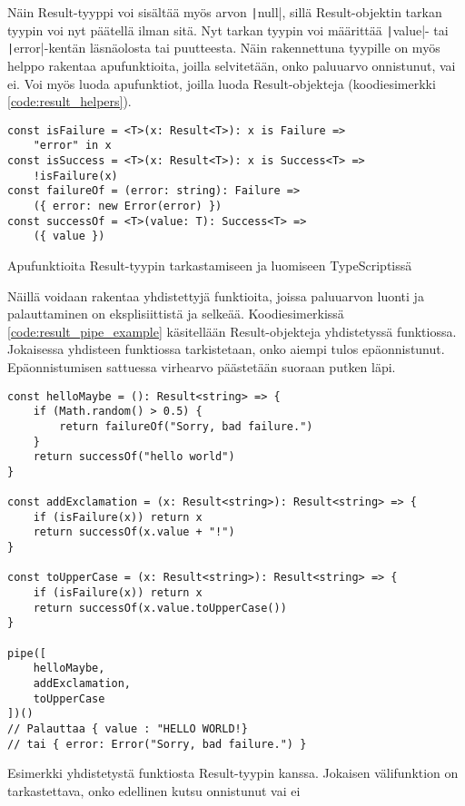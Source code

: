 Näin Result-tyyppi voi sisältää myös arvon \texttt|null|, sillä Result-objektin tarkan tyypin voi nyt päätellä ilman sitä. Nyt tarkan tyypin voi määrittää \texttt|value|- tai \texttt|error|-kentän läsnäolosta tai puutteesta. Näin rakennettuna tyypille on myös helppo rakentaa apufunktioita, joilla selvitetään, onko paluuarvo onnistunut, vai ei. Voi myös luoda apufunktiot, joilla luoda Result-objekteja (koodiesimerkki \ref{code:result_helpers}).

\begin{code}
    \begin{verbatim}
const isFailure = <T>(x: Result<T>): x is Failure => 
    "error" in x
const isSuccess = <T>(x: Result<T>): x is Success<T> => 
    !isFailure(x)
const failureOf = (error: string): Failure => 
    ({ error: new Error(error) })
const successOf = <T>(value: T): Success<T> => 
    ({ value })
    \end{verbatim}
    \caption{Apufunktioita Result-tyypin tarkastamiseen ja luomiseen TypeScriptissä}
    \label{code:result_helpers}
\end{code}

Näillä voidaan rakentaa yhdistettyjä funktioita, joissa paluuarvon luonti ja palauttaminen on eksplisiittistä ja selkeää. Koodiesimerkissä \ref{code:result_pipe_example} käsitellään Result-objekteja yhdistetyssä funktiossa. Jokaisessa yhdisteen funktiossa tarkistetaan, onko aiempi tulos epäonnistunut. Epäonnistumisen sattuessa virhearvo päästetään suoraan putken läpi.

\begin{code}
    \begin{verbatim}
const helloMaybe = (): Result<string> => {
    if (Math.random() > 0.5) {
        return failureOf("Sorry, bad failure.")
    }
    return successOf("hello world")
}

const addExclamation = (x: Result<string>): Result<string> => {
    if (isFailure(x)) return x
    return successOf(x.value + "!")
}

const toUpperCase = (x: Result<string>): Result<string> => {
    if (isFailure(x)) return x
    return successOf(x.value.toUpperCase())
}

pipe([
    helloMaybe,
    addExclamation,
    toUpperCase
])()
// Palauttaa { value : "HELLO WORLD!}
// tai { error: Error("Sorry, bad failure.") }
    \end{verbatim}
    \caption{Esimerkki yhdistetystä funktiosta Result-tyypin kanssa. Jokaisen välifunktion on tarkastettava, onko edellinen kutsu onnistunut vai ei}
    \label{code:result_pipe_example}
\end{code}

